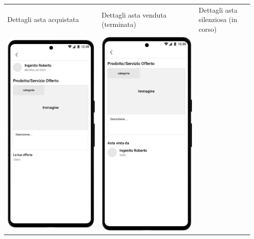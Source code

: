 \bigskip
\begin{center}
	\begin{tabularx}{\linewidth}{>{\raggedright\arraybackslash}X>{\raggedright\arraybackslash}X>{\raggedright\arraybackslash}X}
		Dettagli asta acquistata                                                                          &
		Dettagli asta venduta (terminata)                                                                 &
		Dettagli asta silenziosa \qquad (in corso)                                                               \\
		\includegraphics[width=.3\textwidth]{assets/mockup/Storico aste - acquistate - Dettagli asta.png} &
		\includegraphics[width=.3\textwidth]{assets/mockup/Storico aste - create - terminata.png}         &

\end{tabularx}
\end{center}
